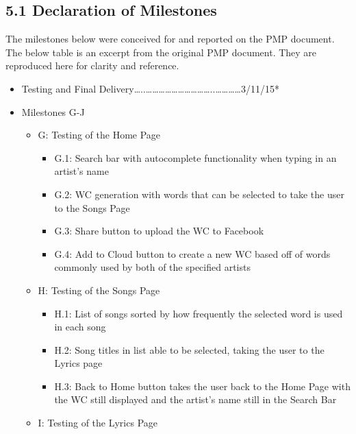 \documentclass[]{article}
\begin{document}
\subsection{\textbf{5.1 Declaration of
Milestones}}\label{declaration-of-milestones}

The milestones below were conceived for and reported on the PMP
document. The below table is an excerpt from the original PMP document.
They are reproduced here for clarity and reference.

\begin{itemize}
\itemsep1pt\parskip0pt
\item
  Testing and Final
  Delivery\ldots{}..\ldots{}\ldots{}\ldots{}\ldots{}\ldots{}\ldots{}\ldots{}\ldots{}\ldots{}\ldots{}..\ldots{}\ldots{}\ldots{}\ldots{}3/11/15*
\item
  Milestones G-J

  \begin{itemize}
  \itemsep1pt\parskip0pt
  \item
    G: Testing of the Home Page

    \begin{itemize}
    \itemsep1pt\parskip0pt
    \item
      G.1: Search bar with autocomplete functionality when typing in an
      artist's name
    \item
      G.2: WC generation with words that can be selected to take the
      user to the Songs Page
    \item
      G.3: Share button to upload the WC to Facebook
    \item
      G.4: Add to Cloud button to create a new WC based off of words
      commonly used by both of the specified artists
    \end{itemize}
  \item
    H: Testing of the Songs Page

    \begin{itemize}
    \itemsep1pt\parskip0pt
    \item
      H.1: List of songs sorted by how frequently the selected word is
      used in each song
    \item
      H.2: Song titles in list able to be selected, taking the user to
      the Lyrics page
    \item
      H.3: Back to Home button takes the user back to the Home Page with
      the WC still displayed and the artist's name still in the Search
      Bar
    \end{itemize}
  \item
    I: Testing of the Lyrics Page


\end{itemize}
\end{itemize}
\end{document}
